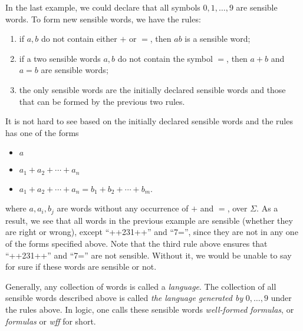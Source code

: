 \documentclass[12pt]{article}
\begin{document}
In the last example, we could declare that all symbols $0,1,\ldots,9$ are sensible words.  To form new sensible words, we have the rules: 
\begin{enumerate}
\item
if $a,b$ do not contain either $+$ or $=$, then $ab$ is a sensible word;
\item
if a two sensible words $a,b$ do not contain the symbol $=$, then $a+b$ and $a=b$ are sensible words;
\item
the only sensible words are the initially declared sensible words and those that can be formed by the previous two rules.
\end{enumerate}
It is not hard to see based on the initially declared sensible words and the rules has one of the forms
\begin{itemize}
\item $a$
\item $a_1+a_2+\cdots +a_n$
\item $a_1+a_2+\cdots + a_n = b_1+b_2+\cdots + b_m$.  
\end{itemize}
where $a,a_i,b_j$ are words without any occurrence of $+$ and $=$, over $\Sigma$.  As a result, we see that all words in the previous example are sensible (whether they are right or wrong), except ``++231++'' and ``7='', since they are not in any one of the forms specified above.  Note that the third rule above ensures that ``++231++'' and ``7='' are not sensible.  Without it, we would be unable to say for sure if these words are sensible or not.

Generally, any collection of words is called a \emph{language}.  The collection of all sensible words described above is called \emph{the language generated by} $0,\ldots,9$ under the rules above.  In logic, one calls these sensible words \emph{well-formed formulas}, or \emph{formulas} or \emph{wff} for short.
\end{document}

